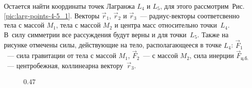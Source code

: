Остается найти координаты точек Лагранжа $L_4$ и $L_5$, для этого рассмотрим~Рис.\,\ref{pic:larg-points-4-5_1}. Векторы $\vec{r}_1$, $\vec{r}_2$ и $\vec{r}_3$~--- радиус-векторы соответсвенно тела с массой $M_1$, тела с массой $M_2$ и центра масс относительно точки~$L_4$. В~силу симметрии  все рассуждения будут верны и для точки~$L_5$. Также на рисунке отмечены силы, действующие на тело, располагающееся в точке $L_4$: $\vec{F}_1$~--- сила гравитации от тела с массой $M_1$, $\vec{F}_2$~--- с массой $M_2$, сила инерции $\vec{F}_\text{ц.б.}$~--- центробежная, коллинеарна вектору~$\vec{r}_3$.

\begin{figure}[h!]
    \hfill
    \begin{subcaptionblock}{0.47\tw}
        \centering
\end{subcaptionblock}
\end{figure}
